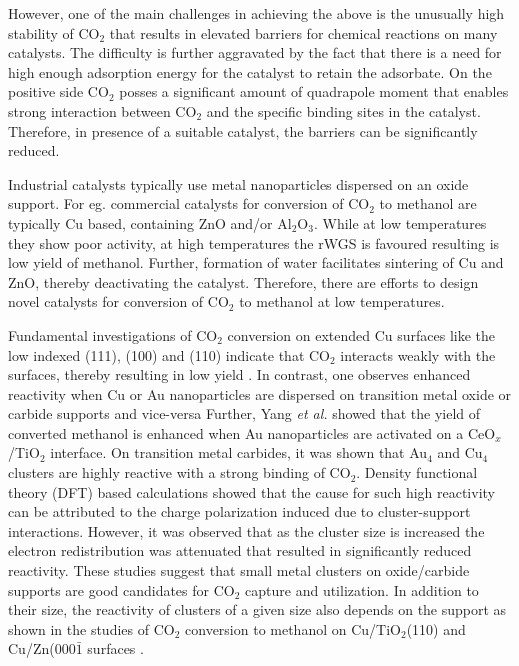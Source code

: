  However, one of the main challenges in achieving the above is the unusually high stability of
 CO$_2$ that results in elevated barriers for chemical reactions on many catalysts. The
 difficulty is further aggravated by the fact that there is a need for high enough
 adsorption energy for the catalyst to retain the adsorbate. On the positive side CO$_2$
 posses a significant amount of quadrapole moment that enables strong interaction between
 CO$_2$ and the specific binding sites in the catalyst\cite{kunkel}. Therefore, in presence of 
 a suitable catalyst, the barriers can be significantly reduced. 
 
 Industrial catalysts typically use metal nanoparticles dispersed on an oxide
 support. For eg. commercial catalysts for conversion of CO$_2$ to methanol are typically Cu based, 
 containing ZnO and/or Al$_2$O$_3$\cite{com1,com2}. While at low
 temperatures they show poor activity, at high temperatures the rWGS is favoured resulting is low yield of methanol.
 Further, formation of water facilitates sintering of Cu and ZnO, thereby deactivating the
 catalyst. Therefore, there are efforts to design novel catalysts for conversion of CO$_2$
 to methanol at low temperatures.
 
 Fundamental investigations of CO$_2$ conversion on extended Cu surfaces like the low
 indexed (111), (100) and (110) indicate that CO$_2$ interacts weakly with the surfaces, thereby
 resulting in low yield \cite{lang2012gas, yang2010fundamental, campbell1989sr, schneider1992interaction, grabow2011mechanism, zhang2018optimum}.
 In contrast, one observes enhanced
 reactivity when Cu or Au nanoparticles are dispersed on transition metal oxide or carbide
 supports and vice-versa \cite{rodriguez2015hydrogenation, zhang2018optimum}
 Further, Yang \textit{et al.}
 showed that the yield of converted methanol is enhanced when Au nanoparticles are activated on a
 CeO$_x$/TiO$_2$ interface\cite{rodriguez2015hydrogenation}.
 On transition metal carbides, it was shown that Au$_4$ and Cu$_4$ clusters are highly reactive
 with a strong binding of CO$_2$. Density functional theory (DFT) based calculations showed that
 the cause for such high reactivity can be attributed to the charge polarization induced due to cluster-support interactions\cite{vidal2012co2, rodriguez2007adsorption, gomez2011reactivity}.
 However, it was observed that as the cluster size is
 increased the electron redistribution was attenuated that resulted in significantly reduced
 reactivity\cite{vidal2012co2, rodriguez2007adsorption, gomez2011reactivity}.
 These studies suggest that small metal clusters on oxide/carbide supports are good candidates
 for CO$_2$ capture and utilization. In addition to their size, the reactivity of clusters of a given size also depends on the support as shown in the studies of CO$_2$ conversion to methanol on
 Cu/TiO$_2$(110)\cite{graciani2014highly}
 and Cu/Zn(000$\bar{1}$ surfaces \cite{yang2017copper}.


